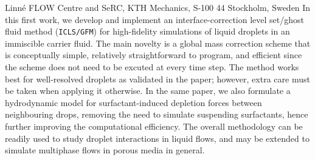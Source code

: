 %
%
%
%
%
%
%
\paperaffiliation
{%
  Linn\'e FLOW Centre and SeRC, KTH Mechanics, S-100 44 Stockholm, Sweden%
}%
%
%
%
%
%
\papernumber{}%
%
%
%
%
%
\papersummary%
{%
In this first work, we develop and implement an interface-correction level set/ghost fluid method (\texttt{ICLS/GFM})
for high-fidelity simulations of liquid droplets in an immiscible carrier fluid.
The main novelty is a global mass correction scheme that is conceptually simple,
relatively straightforward to program,
and efficient since the scheme does not need to be excuted at every time step.
The method works best for well-resolved droplets as validated in the paper;
however, extra care must be taken when applying it otherwise.
In the same paper, we also formulate a hydrodynamic model for surfactant-induced depletion forces between neighbouring drops,
removing the need to simulate suspending surfactants,
hence further improving the computational efficiency.
The overall methodology can be readily used to study droplet interactions in liquid flows,
and may be extended to simulate multiphase flows in porous media in general.
}%
%
\graphicspath{{paper1/}}%
%
%
%
